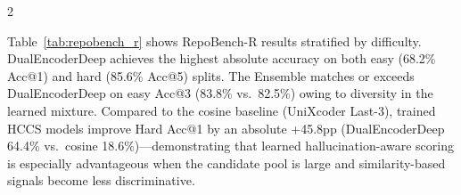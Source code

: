 \documentclass[11pt,a4paper]{article}
\begin{document}
\begin{multicols}{2}
\begin{center}
\label{tab:retrieval_test}
\end{center}

Table~\ref{tab:repobench_r} shows RepoBench-R results stratified by difficulty. DualEncoderDeep achieves the highest absolute accuracy on both easy (68.2\% Acc@1) and hard (85.6\% Acc@5) splits. The Ensemble matches or exceeds DualEncoderDeep on easy Acc@3 (83.8\% vs.\ 82.5\%) owing to diversity in the learned mixture. Compared to the cosine baseline (UniXcoder Last-3), trained HCCS models improve Hard Acc@1 by an absolute +45.8pp (DualEncoderDeep 64.4\% vs.\ cosine 18.6\%)---demonstrating that learned hallucination-aware scoring is especially advantageous when the candidate pool is large and similarity-based signals become less discriminative.


\end{multicols}
\end{document}
